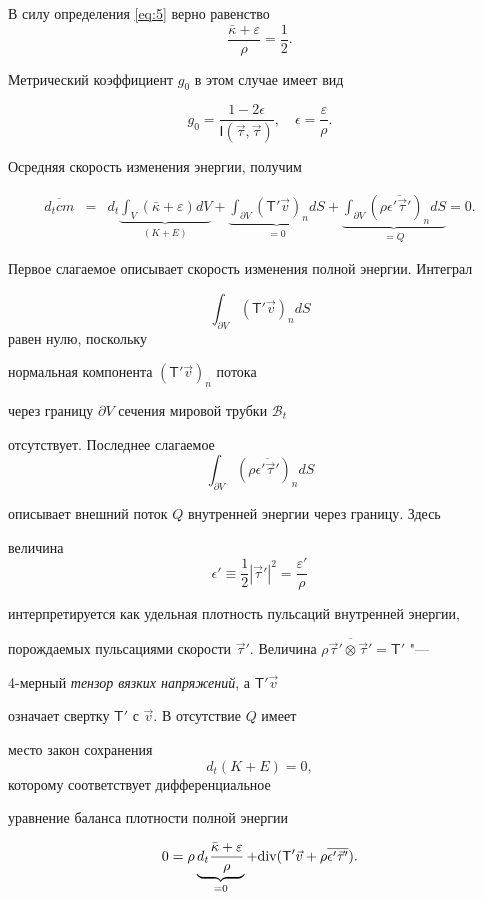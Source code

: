 В силу определения \eqref{eq:5} верно равенство $$\frac{\bar{\kappa}+\varepsilon}{\rho}=\frac{1}{2}.$$

Метрический коэффициент $g_{0}$ в этом случае имеет вид 

$$g_{0}=\frac{1-2\epsilon}{\mathsf{I}(\vec{\tau},\vec{\tau})},\quad \epsilon=\frac{\varepsilon}{\rho}.$$ 

Осредняя скорость изменения энергии, получим

\begin{eqnarray*}

\overline{d_{t}cm} & = & d_{t}\underbrace{\int_{V}\left(\bar{\kappa}+\varepsilon\right)dV}_{(K+E)}+\underbrace{\int_{\partial V}(\mathsf{T}'\vec{v})_{n}dS}_{=0}+\underbrace{\int_{\partial V}(\rho\overline{\epsilon'\vec{\tau}'})_{n}dS}_{=Q}=0.

\end{eqnarray*}

Первое слагаемое описывает скорость изменения полной энергии. Интеграл

$$\int_{\partial V}(\mathsf{T}'\vec{v})_{n}dS$$ равен нулю, поскольку

нормальная компонента $\left(\mathsf{T}'\vec{v}\right)_{n}$ потока

через границу $\partial V$ сечения мировой трубки $\mathcal{B}_{t}$

отсутствует. Последнее слагаемое $$\int_{\partial V}(\rho\overline{\epsilon'\vec{\tau}'})_{n}dS$$

описывает внешний поток $Q$ внутренней энергии через границу. Здесь

величина $$\epsilon'\equiv\frac{1}{2}|\vec{\tau}'|^{2}=\frac{\varepsilon'}{\rho}$$

интерпретируется как удельная плотность пульсаций внутренней энергии,

порождаемых пульсациями скорости $\vec{\tau}'$. Величина $\rho\overline{\vec{\tau}'\otimes\vec{\tau}'}=\mathsf{T'}$ "--- 

4-мерный \emph{тензор вязких напряжений}, а $\mathsf{T}'\vec{v}$

означает свертку $\mathsf{T'}$ с $\vec{v}$. В отсутствие $Q$ имеет

место закон сохранения $$d_{t}(K+E)=0,$$ которому соответствует дифференциальное

уравнение баланса плотности полной энергии

\begin{equation}

0=\rho\underbrace{d_{t}\frac{\bar{\kappa}+\varepsilon}{\rho}}_{=0}+\textnormal{div}(\mathsf{T}'\vec{v}+\rho\overline{\epsilon'\vec{\tau}'}).\label{eq:7-2}

\end{equation}





